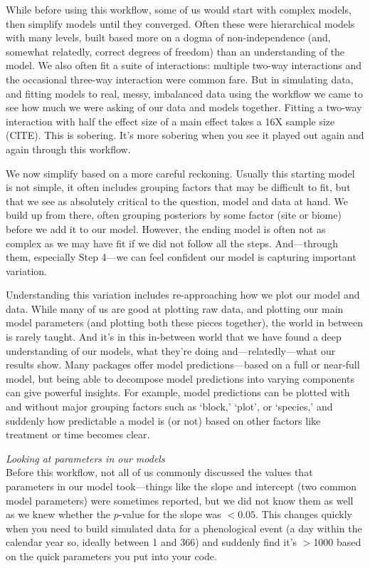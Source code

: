 \documentclass[11pt]{article}
\begin{document}
While before using this workflow, some of us would start with complex models, then simplify models until they converged. Often these were hierarchical models with many levels, built based more on a dogma of non-independence (and, somewhat relatedly, correct degrees of freedom) than an understanding of the model. We also often fit a suite of interactions: multiple two-way interactions and the occasional three-way interaction were common fare. But in simulating data, and fitting models to real, messy, imbalanced data using the workflow we came to see how much we were asking of our data and models together. Fitting a two-way interaction with half the effect size of a main effect takes a 16X sample size (CITE). This is sobering. It's more sobering when you see it played out again and again through this workflow. 

We now simplify based on a more careful reckoning. Usually this starting model is not simple, it often includes grouping factors that may be difficult to fit, but that we see as absolutely critical to the question, model and data at hand. We build up from there, often grouping posteriors by some factor (\eg site or biome) before we add it to our model. However, the ending model is often not as complex as we may have fit if we did not follow all the steps. And---through them, especially Step 4---we can feel confident our model is capturing important variation. 

Understanding this variation includes re-approaching how we plot our model and data. While many of us are good at plotting raw data, and plotting our main model parameters (and plotting both these pieces together), the world in between is rarely taught. And it's in this in-between world that we have found a deep understanding of our models, what they're doing and---relatedly---what our results show. Many packages offer model predictions---based on a full or near-full model, but being able to decompose model predictions into varying components can give powerful insights. For example, model predictions can be plotted with and without major grouping factors such as `block,' `plot', or `species,' and suddenly how predictable a model is (or not) based on other factors like treatment or time becomes clear. 

 \emph{Looking at parameters in our models} \\
Before this workflow, not all of us commonly discussed the values that parameters in our model took---things like the slope and intercept (two common model parameters) were sometimes reported, but we did not know them as well as we knew whether the $p$-value for the slope was $<0.05$. This changes quickly when you need to build simulated data for a phenological event (a day within the calendar year so, ideally between 1 and 366) and suddenly find it's $>$1000 based on the quick parameters you put into your code. 
\end{document}
